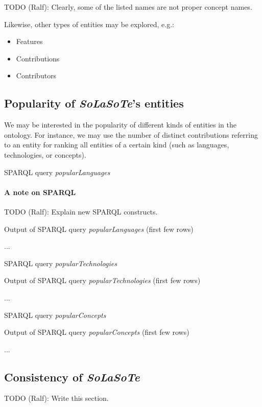 \documentclass{article}
\newcommand{\todo}[2]{\noindent{}TODO (#1): #2}
\newcommand{\solasote}{{\itshape\textsf{SoLaSoTe}}}
\newcommand{\sparqlnote}[1]{
\paragraph{A note on SPARQL} #1
}
\newcommand{\sparql}[1]{%
\medskip

\noindent
\begin{boxedminipage}{\hsize}
\hfill{}SPARQL query \emph{#1}

\end{boxedminipage}
\medskip
}
\newcommand{\partialOutput}[2]{%

\medskip

\noindent
\begin{boxedminipage}{\hsize}
\hfill{}Output of SPARQL query \emph{#2} (first few rows)

{\large{}...}
\end{boxedminipage}
\medskip
}
\begin{document}
\todo{Ralf}{Clearly, some of the listed names are not proper concept names.}

Likewise, other types of entities may be explored, e.g.:

\begin{itemize}
\item Features
\item Contributions
\item Contributors
\end{itemize}


\subsection{Popularity of \solasote's entities}

We may be interested in the popularity of different kinds of entities
in the ontology. For instance, we may use the number of distinct
contributions referring to an entity for ranking all entities of a
certain kind (such as languages, technologies, or concepts). 

\sparql{popularLanguages}

\sparqlnote{\todo{Ralf}{Explain new SPARQL constructs.}}

\partialOutput{7}{popularLanguages}

\sparql{popularTechnologies}

\partialOutput{7}{popularTechnologies}

\sparql{popularConcepts}

\partialOutput{7}{popularConcepts}


\subsection{Consistency of \solasote}

\todo{Ralf}{Write this section.}


\begin{comment}

























\end{comment}
\end{document}
